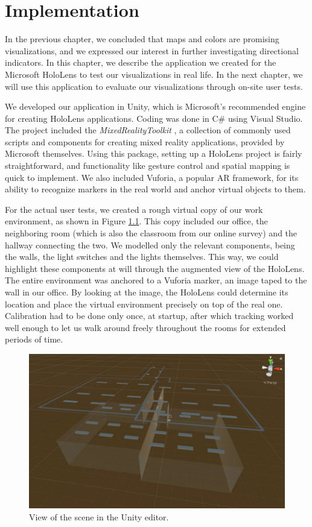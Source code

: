 \chapter{Implementation} \label{chap:impl}
In the previous chapter, we concluded that maps and colors are promising visualizations, and we expressed our interest in further investigating directional indicators. In this chapter, we describe the application we created for the Microsoft HoloLens to test our visualizations in real life. In the next chapter, we will use this application to evaluate our visualizations through on-site user tests.

We developed our application in Unity, which is Microsoft's recommended engine for creating HoloLens applications. Coding was done in C\# using Visual Studio. The project included the \textit{MixedRealityToolkit} \cite{Microsof99:online}, a collection of commonly used scripts and components for creating mixed reality applications, provided by Microsoft themselves. Using this package, setting up a HoloLens project is fairly straightforward, and functionality like gesture control and spatial mapping is quick to implement. We also included Vuforia, a popular AR framework, for its ability to recognize markers in the real world and anchor virtual objects to them.

For the actual user tests, we created a rough virtual copy of our work environment, as shown in Figure \ref{fig:model}. This copy included our office, the neighboring room (which is also the classroom from our online survey) and the hallway connecting the two. We modelled only the relevant components, being the walls, the light switches and the lights themselves. This way, we could highlight these components at will through the augmented view of the HoloLens. The entire environment was anchored to a Vuforia marker, an image taped to the wall in our office. By looking at the image, the HoloLens could determine its location and place the virtual environment precisely on top of the real one. Calibration had to be done only once, at startup, after which tracking worked well enough to let us walk around freely throughout the rooms for extended periods of time.

\begin{figure}
    \centering
    \includegraphics[width=0.8\linewidth]{resources/implementation/model.jpg}
    \caption{View of the scene in the Unity editor.}
    \label{fig:model}
\end{figure}

